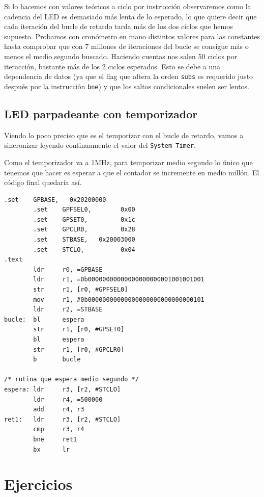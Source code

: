 Si lo hacemos con valores teóricos a ciclo por instrucción observaremos como la cadencia del
LED es demasiado más lenta de lo esperado, lo que quiere decir que cada iteración del bucle
de retardo tarda más de los dos ciclos que hemos supuesto.
Probamos con cronómetro en mano distintos valores para las constantes hasta comprobar que con
7 millones de iteraciones del bucle se consigue más o menos el medio segundo buscado. Haciendo
cuentas nos salen 50 ciclos por iteracción, bastante más de los 2 ciclos esperados. Esto se
debe a una dependencia de datos (ya que el flag que altera
la orden {\tt subs} es requerido justo después por la instrucción {\tt bne}) y que los saltos
condicionales suelen ser lentos.

\subsection{LED parpadeante con temporizador}

Viendo lo poco preciso que es el temporizar con el bucle de retardo, vamos a sincronizar leyendo
continuamente el valor del {\tt System Timer}.

Como el temporizador va a 1MHz, para temporizar medio segundo lo
único que tenemos que hacer es esperar a que el contador se incremente en medio millón. El código
final quedaría así.

\begin{lstlisting}[caption={esbn5.s},label={lst:codigoPract4_5}]
        .set    GPBASE,   0x20200000
        .set    GPFSEL0,        0x00
        .set    GPSET0,         0x1c
        .set    GPCLR0,         0x28
        .set    STBASE,   0x20003000
        .set    STCLO,          0x04
.text
        ldr     r0, =GPBASE
        ldr     r1, =0b00000000000000000000001001001001
        str     r1, [r0, #GPFSEL0]
        mov     r1, #0b00000000000000000000000000000101
        ldr     r2, =STBASE
bucle:  bl      espera
        str     r1, [r0, #GPSET0]
        bl      espera
        str     r1, [r0, #GPCLR0]
        b       bucle

/* rutina que espera medio segundo */
espera: ldr     r3, [r2, #STCLO]
        ldr     r4, =500000
        add     r4, r3
ret1:   ldr     r3, [r2, #STCLO]
        cmp     r3, r4
        bne     ret1
        bx      lr
\end{lstlisting}

\section{Ejercicios}

